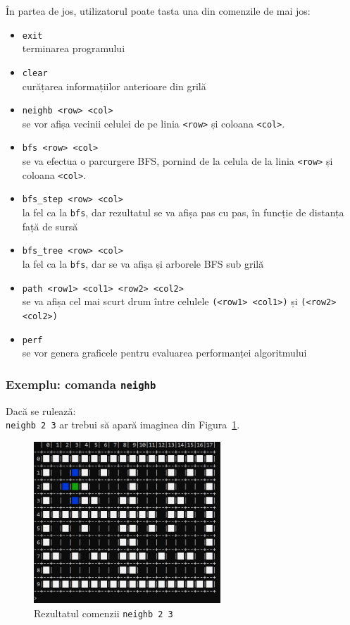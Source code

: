 \documentclass[../ro-fa-lab.tex]{subfiles}
\begin{document}
În partea de jos, utilizatorul poate tasta una din comenzile de mai jos:
\begin{itemize}
    \item \texttt{exit}\\
        terminarea programului
    \item \texttt{clear}\\
        curățarea informațiilor anterioare din grilă
    \item \texttt{neighb <row> <col>} \\
        se vor afișa vecinii celulei de pe linia \texttt{<row>} și coloana \texttt{<col>}.
    \item \texttt{bfs <row> <col>} \\
        se va efectua o parcurgere BFS, pornind de la celula de la linia \texttt{<row>} și coloana \texttt{<col>}.
    \item \texttt{bfs\_step <row> <col>} \\
        la fel ca la \texttt{bfs}, dar rezultatul se va afișa pas cu pas, în funcție de distanța față de sursă
    \item \texttt{bfs\_tree <row> <col>} \\
        la fel ca la \texttt{bfs}, dar se va afișa și arborele BFS sub grilă
    \item \texttt{path <row1> <col1> <row2> <col2>} \\
        se va afișa cel mai scurt drum între celulele \texttt{(<row1> <col1>)} și \texttt{(<row2> <col2>)}
    \item \texttt{perf} \\
        se vor genera graficele pentru evaluarea performanței algoritmului
\end{itemize}

\subsubsection{Exemplu: comanda \texttt{neighb}}
Dacă se rulează:\\
\texttt{neighb 2 3}
ar trebui să apară imaginea din Figura~\ref{fig:neighb}.

\begin{figure}[h]
    \centering
    \includegraphics[width=7cm]{../Resources/lab9/grid_neighb.png}
    \caption{Rezultatul comenzii \texttt{neighb 2 3}}
    \label{fig:neighb}
\end{figure}
\end{document}
